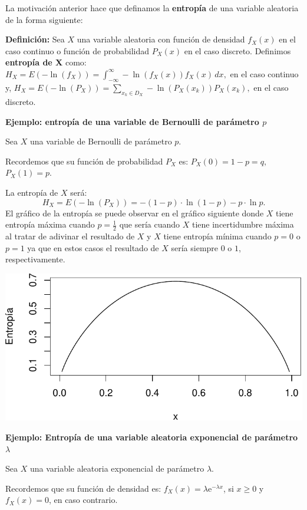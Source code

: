 \documentclass[
  letterpaper,
  DIV=11,
  numbers=noendperiod]{scrreprt}
\begin{document}
La motivación anterior hace que definamos la \textbf{entropía} de una
variable aleatoria de la forma siguiente:

\textbf{Definición:} Sea \(X\) una variable aleatoria con función de
densidad \(f_X(x)\) en el caso continuo o función de probabilidad
\(P_X(x)\) en el caso discreto. Definimos \textbf{entropía de X} como:
\(H_X = \displaystyle E\left(-\ln(f_X)\right)=\int_{-\infty}^\infty -\ln(f_X(x)) f_X(x)\, dx,\)
en el caso continuo y,
\(H_X = \displaystyle E\left(-\ln(P_X)\right)=\sum_{x_k\in D_X} -\ln(P_X(x_k)) P_X(x_k),\)
en el caso discreto.

\textbf{Ejemplo: entropía de una variable de Bernoulli de parámetro
\(p\)}

Sea \(X\) una variable de Bernoulli de parámetro \(p\).

Recordemos que su función de probabilidad \(P_X\) es: \(P_X(0)=1-p=q,\)
\(P_X(1)=p\).

La entropía de \(X\) será: \[
H_X = E\left(-\ln(P_X)\right) = -(1-p)\cdot \ln(1-p)-p\cdot \ln p.
\] El gráfico de la entropía se puede observar en el gráfico siguiente
donde \(X\) tiene entropía máxima cuando \(p=\frac{1}{2}\) que sería
cuando \(X\) tiene incertidumbre máxima al tratar de adivinar el
resultado de \(X\) y \(X\) tiene entropía mínima cuando \(p=0\) o
\(p=1\) ya que en estos casos el resultado de \(X\) sería siempre \(0\)
o \(1\), respectivamente.

\includegraphics{4_files/figure-pdf/unnamed-chunk-13-1.pdf}

\textbf{Ejemplo: Entropía de una variable aleatoria exponencial de
parámetro \(\lambda\)}

Sea \(X\) una variable aleatoria exponencial de parámetro \(\lambda\).

Recordemos que su función de densidad es:
\(f_X(x)=\lambda \mathrm{e}^{-\lambda x}\), si \(x\geq 0\) y
\(f_X(x)=0\), en caso contrario.
\end{document}
